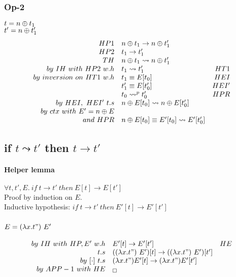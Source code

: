 \documentclass{article}
\newcommand{\bop}[0]{\ensuremath\oplus}
\newcommand{\lam}[2]{\ensuremath{\lambda#1.#2}}
\begin{document}
\subsubsection{Op-2}
$t = n \bop t_1$ \\
$t'= n \bop t_1'$
\begin{align*}
    \begin{array}{rlr}
        HP1 & n \bop t_1 \to n \bop t_1' \\
        HP2 & t_1 \to t_1' \\
        TH  & n \bop t_1 \leadsto n \bop t_1' \\
        by\ IH\ with\ HP2\ w.h & t_1\leadsto t_1' & HT1 \\
        by\ inversion\ on\ HT1\ w.h & t_1 \equiv E[t_0] & HEI \\
                                    & t_1'\equiv E[t_0']  & HEI' \\
                                    & t_0 \leadsto^p t_0' & HPR \\
        by\ HEI,\ HEI'\ t.s         & n \bop E[t_0] \leadsto n \bop E[t_0'] \\
        by\ ctx\ with\ E' = n \bop E \\
        and\ HPR & n\bop E[t_0]  \equiv E'[t_0]\leadsto E'[t_0']
    \end{array}
\end{align*}

\subsection{if $t\leadsto t'$ then $t\to t'$}
\paragraph{Helper lemma} $\forall t,t',E.\ if\ t\to t'\ then\ E[t]\to E[t']$ \\
Proof by induction on $E$. \\
Inductive hypothesis: $if\ t\to t'\ then\ E'[t] \to E'[t']$

\subsubsection{$E = (\lam{x}{t"})\ E'$}
\begin{align*}
    \begin{array}{rlr}
        by\ IH\ with\ HP,E'\ w.h & E'[t]\to E'[t'] & HE \\
        t.s & ((\lam{x}{t"})\ E')[t] \to ((\lam{x}{t"})\ E')[t'] \\
        by\ [\cdot]\ t.s & (\lam{x}{t"})E'[t] \to (\lam{x}{t"})E'[t'] \\
        by\ APP-1\ with\ HE & _\square
    \end{array}
\end{align*}
\end{document}
